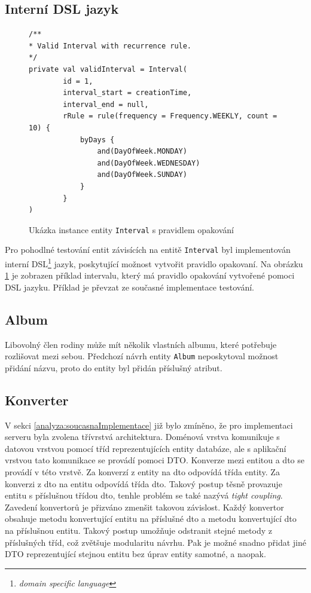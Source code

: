     \subsection{Interní DSL jazyk}\label{navrh:zmeny:dsl}
        \begin{figure} %
            \begin{verbatim}
/**
* Valid Interval with recurrence rule.
*/
private val validInterval = Interval(
        id = 1,
        interval_start = creationTime,
        interval_end = null,
        rRule = rule(frequency = Frequency.WEEKLY, count = 10) {
            byDays {
                and(DayOfWeek.MONDAY)
                and(DayOfWeek.WEDNESDAY)
                and(DayOfWeek.SUNDAY)
            }
        }
)
            \end{verbatim}
            \caption{Ukázka instance entity \texttt{Interval} s pravidlem opakování} 
            \label{code:valid-interval}
        \end{figure}
        Pro pohodlné testování entit závisících na entitě \verb|Interval| byl implementován interní DSL\footnote{\textit{domain specific language}} jazyk, poskytující možnost vytvořit pravidlo opakovaní. Na obrázku \ref{code:valid-interval} je zobrazen příklad intervalu, který má pravidlo opakování vytvořené pomoci DSL jazyku. Příklad je převzat ze současné implementace testování.

    \subsection{Album}
        Libovolný člen rodiny může mít několik vlastních albumu, které potřebuje rozlišovat mezi sebou. Předchozí návrh entity \verb|Album| neposkytoval možnost přidání názvu, proto do entity byl přidán příslušný atribut.
        
    \subsection{Konverter}
        V sekci \ref{analyza:soucasnaImplementace} již bylo zmíněno, že pro implementaci serveru byla zvolena třívrstvá architektura. Doménová vrstva komunikuje s datovou vrstvou pomocí tříd reprezentujících entity databáze, ale s aplikační vrstvou tato komunikace se provádí pomoci DTO. Konverze mezi entitou a dto se provádí v této vrstvě. Za konverzí z entity na dto odpovídá třída entity. Za konverzi z dto na entitu odpovídá třída dto.
        Takový postup těsně provazuje entitu s příslušnou třídou dto, tenhle problém se také nazývá \textit{tight coupling}. Zavedení konvertorů je přizváno zmenšit takovou závislost. Každý konvertor obsahuje metodu konvertující entitu na příslušné dto a metodu konvertující dto na příslušnou entitu. Takový postup umožňuje odstranit stejné metody z příslušných tříd, což zvětšuje modularitu návrhu. 
        Pak je možné snadno přidat jiné DTO reprezentující stejnou entitu bez úprav entity samotné, a naopak.
        

